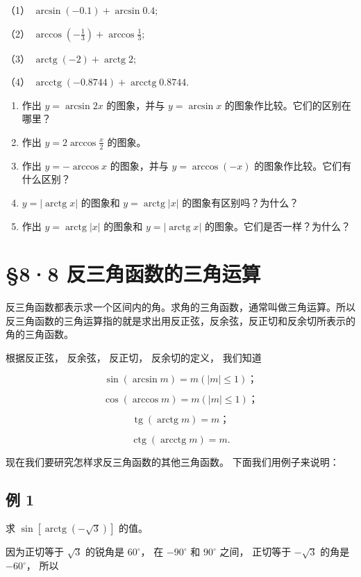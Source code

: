 （1） \(\arcsin (-0.1) + \arcsin 0.4;\)

（2） \(\arccos \left(-\frac{1}{3}\right) + \arccos \frac{1}{3};\)

（3） \(\operatorname{arctg}(-2) + \operatorname{arctg}2;\)

（4） \(\operatorname{arcctg}(-0.8744) + \operatorname{arcctg}0.8744.\)

\begin{enumerate}[start=3]
\item
  作出 \(y = \arcsin 2x\) 的图象，并与 \(y = \arcsin x\)
  的图象作比较。它们的区别在哪里？
\item
  作出 \(y = 2\arccos \frac{x}{2}\) 的图象。
\item
  作出 \(y = -\arccos x\) 的图象，并与 \(y = \arccos (-x)\)
  的图象作比较。它们有什么区别？
\item
  \(y = |\operatorname{arctg} x|\) 的图象和
  \(y = \operatorname{arctg} |x|\) 的图象有区别吗？为什么？
\item
  作出 \(y = \operatorname{arctg}|x|\) 的图象和
  \(y = |\operatorname{arctg} x|\) 的图象。它们是否一样？为什么？
\end{enumerate}

\section{§8·8 反三角函数的三角运算}

反三角函数都表示求一个区间内的角。求角的三角函数，通常叫做三角运算。所以反三角函数的三角运算指的就是求出用反正弦，反余弦，反正切和反余切所表示的角的三角函数。

根据反正弦， 反余弦， 反正切， 反余切的定义， 我们知道

\[
\sin (\arcsin m) = m (| m | \leqslant 1)\text{；}
\]

\[
\cos (\arccos m) = m (| m | \leqslant 1)\text{；}
\]

\[
\operatorname{tg} (\operatorname{arctg} m) = m\text{；}
\]

\[
\operatorname{ctg} (\operatorname{arcctg} m) = m.
\]

现在我们要研究怎样求反三角函数的其他三角函数。 下面我们用例子来说明：

\subsection{例 1}

求 \(\sin [\operatorname{arctg}(-\sqrt{3})]\) 的值。

 因为正切等于 \(\sqrt{3}\) 的锐角是 \(60^{\circ}\)， 在
\(-90^{\circ}\) 和 \(90^{\circ}\) 之间， 正切等于 \(-\sqrt{3}\) 的角是
\(-60^{\circ}\)， 所以

